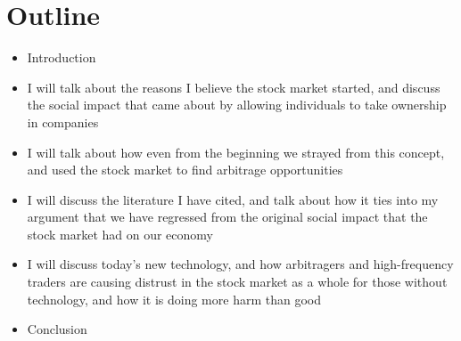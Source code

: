 \documentclass[11pt,]{article}
\begin{document}
\section{Outline}\label{outline}

\begin{itemize}
\item
  Introduction
\item
  I will talk about the reasons I believe the stock market started, and
  discuss the social impact that came about by allowing individuals to
  take ownership in companies
\item
  I will talk about how even from the beginning we strayed from this
  concept, and used the stock market to find arbitrage opportunities
\item
  I will discuss the literature I have cited, and talk about how it ties
  into my argument that we have regressed from the original social
  impact that the stock market had on our economy
\item
  I will discuss today's new technology, and how arbitragers and
  high-frequency traders are causing distrust in the stock market as a
  whole for those without technology, and how it is doing more harm than
  good
\item
  Conclusion
\end{itemize}

\newpage
\singlespacing 

\end{document}
